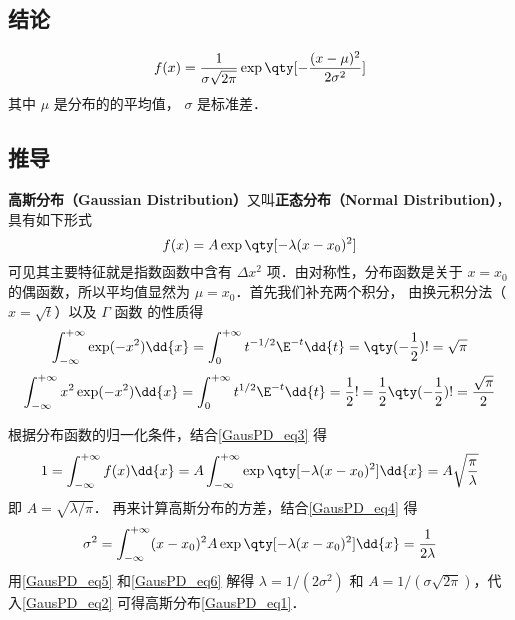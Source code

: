 
\subsection{结论}
\begin{equation}\label{GausPD_eq1}
f(x) = \frac{1}{\sigma \sqrt{2\pi }} \exp\qty[-\frac{(x - \mu )^2}{2\sigma ^2}]
\end{equation}
其中 $\mu$ 是分布的的平均值， $\sigma$ 是标准差．

\subsection{推导}
\textbf{高斯分布（Gaussian Distribution）}又叫\textbf{正态分布（Normal Distribution）}， 具有如下形式
\begin{equation}\label{GausPD_eq2}
f(x) = A\exp\qty[-\lambda (x - x_0)^2]
\end{equation}
可见其主要特征就是指数函数中含有 $\Delta x^2$ 项．由对称性，分布函数是关于 $x =x_0$ 的偶函数，所以平均值显然为 $\mu = x_0$．首先我们补充两个积分， 由换元积分法（$x=\sqrt{t}$）以及 $\Gamma$ 函数 的性质得
\begin{equation}\label{GausPD_eq3}
\int_{-\infty }^{+\infty } \exp (-x^2)\dd{x}  = \int_0^{+\infty} t^{-1/2}\E^{ - t} \dd{t}  = \qty(-\frac12)! = \sqrt \pi 
\end{equation}
\begin{equation}\label{GausPD_eq4}
\int_{-\infty}^{+\infty} x^2\exp(-x^2)\dd{x}  = \int_0^{+\infty} t^{1/2}\E^{-t} \dd{t}  = \frac12 ! = \frac12 \qty(-\frac12)! = \frac{\sqrt\pi}{2}
\end{equation}

根据分布函数的归一化条件，结合\autoref{GausPD_eq3} 得
\begin{equation}\label{GausPD_eq5}
1 = \int_{-\infty}^{+\infty} f(x) \dd{x}  = A\int_{-\infty}^{+\infty} \exp\qty[-\lambda (x - x_0)^2] \dd{x}  = A\sqrt{\frac{\pi}{\lambda}}
\end{equation}
即 $A = \sqrt{\lambda/\pi}$． 再来计算高斯分布的方差，结合\autoref{GausPD_eq4} 得
\begin{equation}\label{GausPD_eq6}
\sigma ^2 = \int_{-\infty}^{+\infty} (x - x_0)^2 A\exp\qty[-\lambda (x - x_0)^2] \dd{x}  = \frac{1}{2\lambda}
\end{equation}
用\autoref{GausPD_eq5} 和\autoref{GausPD_eq6} 解得 $\lambda = 1/(2\sigma^2)$ 和 $A = 1/(\sigma\sqrt{2\pi})$，代入\autoref{GausPD_eq2} 可得高斯分布\autoref{GausPD_eq1}．